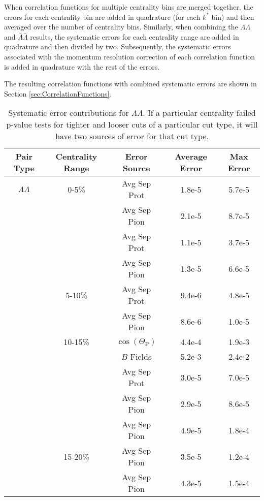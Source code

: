 When correlation functions for multiple centrality bins are merged together, the errors for each centrality bin are added in quadrature (for each $k^*$ bin) and then averaged over the number of centrality bins.  
Similarly, when combining the $\Lambda\Lambda$ and $\bar{\Lambda}\bar{\Lambda}$ results, the systematic errors for each centrality range are added in quadrature and then divided by two.  
Subsequently, the systematic errors associated with the momentum resolution correction of each correlation function is added in quadrature with the rest of the errors.

The resulting correlation functions with combined systematic errors are shown in Section \ref{sec:CorrelationFunctions}.

\begin{table}
\caption[Systematic error contributions for $\Lambda\Lambda$] {Systematic error contributions for $\Lambda\Lambda$.  
If a particular centrality failed p-value tests for tighter and looser cuts of a particular cut type, it will have two sources of error for that cut type.} \label{tab:SysErrorSourcesLL} 
\begin{center}
\begin{tabular}{| c | c | c | c | c |}
  \hline                       
  Pair Type & Centrality Range & Error Source & Average Error & Max Error \\
  \hline
  $\Lambda\Lambda$ & 0-5\% & Avg Sep Prot & 1.8e-5 & 5.7e-5 \\
   &         & Avg Sep Pion & 2.1e-5 & 8.7e-5 \\
   &         & Avg Sep Prot & 1.1e-5 & 3.7e-5 \\
   &         & Avg Sep Pion & 1.3e-5 & 6.6e-5 \\
   & 5-10\%  & Avg Sep Prot & 9.4e-6 & 4.8e-5 \\
   &         & Avg Sep Pion & 8.6e-6 & 1.0e-5 \\
   & 10-15\% & $\cos(\Theta_{\mathrm{P}})$ & 4.4e-4 & 1.9e-3 \\
   &         & $B$ Fields & 5.2e-3 & 2.4e-2 \\
   &         & Avg Sep Prot & 3.0e-5 & 7.0e-5 \\
   &         & Avg Sep Pion & 2.9e-5 & 8.6e-5 \\
   &         & Avg Sep Pion & 4.9e-5 & 1.8e-4 \\
   & 15-20\% & Avg Sep Pion & 3.5e-5 &  1.2e-4 \\
   &         & Avg Sep Pion & 4.3e-5 & 1.5e-4 \\

\end{tabular}
\end{center}
\end{table}
